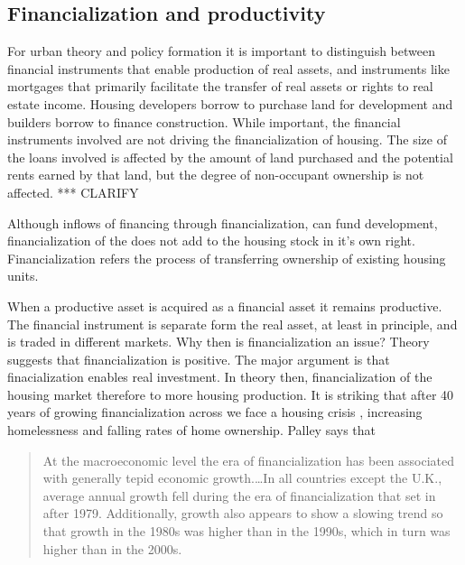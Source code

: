 \subsection{Financialization and productivity}

For urban theory and policy formation it is important to distinguish between financial instruments that enable production of real assets, and instruments like  mortgages that primarily facilitate the transfer of real assets or rights to real estate income. Housing developers borrow to purchase land for development and builders borrow to finance construction. While important, the financial instruments involved are not driving the financialization of housing.  The size of the loans involved is affected by the amount of land purchased and the potential rents earned by that land, but the degree of non-occupant ownership is not affected. *** CLARIFY

Although inflows of financing through financialization, can fund development, financialization of the does not add to the housing stock in it's own right. Financialization refers the process of transferring ownership of existing housing units. 

When  a productive asset is acquired as a financial asset it remains productive.  The financial instrument is separate form the real asset, at least in principle, and is traded in different markets. Why then is financialization an issue?  Theory suggests that financialization is positive.  The major argument is that finacialization enables real investment. In theory then, financialization of the housing market therefore  to more housing production. It is striking that after 40 years of growing financialization across we face a housing crisis , increasing homelessness and falling rates of home ownership.  Palley \cite{palleyFinancializationWhatIt2007} says that 

\begin{quotation}At the macroeconomic level the era of financialization has been associated with generally tepid economic growth.\dots  In all countries except the U.K., average annual growth fell during the era of financialization that set in after 1979. Additionally, growth also appears to show a slowing trend so that growth in the 1980s was higher than in the 1990s, which in turn was higher than in the 2000s. \end{quotation}


